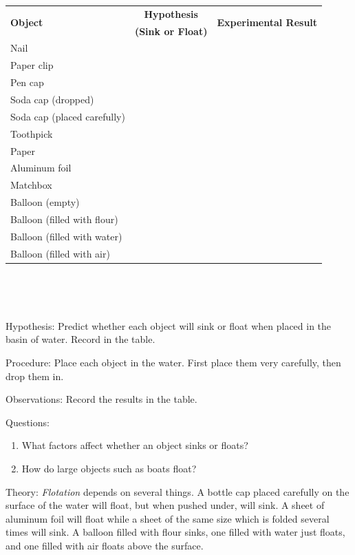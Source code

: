 \begin{description*}
{\begin{tabular}{|l|c|c|} \hline
\multirow{2}{*}{\textbf{Object}} & \textbf{Hypothesis} & \multirow{2}{*}{\textbf{Experimental Result}} \\
& \textbf{(Sink or Float)} & \\ \hline
Nail& & \\ \hline
Paper clip& & \\ \hline
Pen cap& & \\ \hline
Soda cap (dropped)& & \\ \hline
Soda cap (placed carefully)& & \\ \hline
Toothpick & & \\ \hline
Paper& & \\ \hline
Aluminum foil& & \\ \hline
Matchbox& & \\ \hline
Balloon (empty)& & \\ \hline
Balloon (filled with flour)& & \\ \hline
Balloon (filled with water)& & \\ \hline
Balloon (filled with air)& & \\ \hline
\end{tabular} \\[10pt]
}\\
\item[Hypothesis:]{Predict whether each object will sink or float when placed in the basin of water. Record in the table.}
\item[Procedure:]{Place each object in the water. First place them very carefully, then drop them in.}
\item[Observations:]{Record the results in the table.}
\item[Questions:]{}\hfill
\begin{enumerate}
\item What factors affect whether an object sinks or floats?
\item How do large objects such as boats float?
\end{enumerate}
\item[Theory:]{\emph{Flotation} depends on several things. A bottle cap placed carefully on the surface of the water will float, but when pushed under, will sink. A sheet of aluminum foil will float while a sheet of the same size which is folded several times will sink. A balloon filled with flour sinks, one filled with water just floats, and one filled with air floats above the surface.\\

}
\end{description*}
